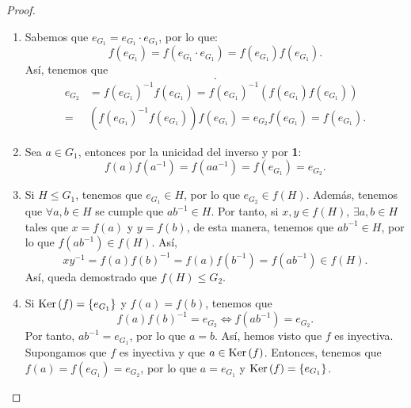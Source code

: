 \begin{proof}
\begin{enumerate}
\item Sabemos que $\displaystyle e_{G_{1}} = e_{G_{1}} \cdot e_{G_{1}} $, por lo que:
	\[f\left(e_{G_{1}}\right) = f\left(e_{G_{1}} \cdot e_{G_{1}}\right)=f\left(e_{G_{1}}\right)f\left(e_{G_{1}}\right) .\]
Así, tenemos que 
\[ .\]
\[
\begin{split}
	e_{G_{2}}  &= f\left(e_{G_{1}}\right)^{-1}f\left(e_{G_{1}}\right) = f\left(e_{G_{1}}\right)^{-1}\left(f\left(e_{G_{1}}\right)f\left(e_{G_{1}}\right)\right) \\
	= &  \left(f\left(e_{G_{1}}\right)^{-1}f\left(e_{G_{1}}\right)\right)f\left(e_{G_{1}}\right) = e_{G_{2}}f\left(e_{G_{1}}\right) = f\left(e_{G_{1}}\right).
\end{split}
\]
\item Sea $\displaystyle a \in G_{1} $, entonces por la unicidad del inverso y por \textbf{1}:
	\[f\left(a\right) f\left(a^{-1}\right) = f\left(a a^{-1}\right) = f\left(e_{G_{1}}\right) = e_{G_{2}} .\]
\item Si $\displaystyle H \leq G_{1} $, tenemos que $\displaystyle e_{G_{1}} \in H $, por lo que $\displaystyle e_{G_{2}} \in f\left(H\right) $. Además, tenemos que $\displaystyle \forall a,b \in H $ se cumple que $\displaystyle a b^{-1} \in H $. Por tanto, si $\displaystyle x,y \in f\left(H\right) $, $\displaystyle \exists a,b \in H $ tales que $\displaystyle x = f\left(a\right) $ y $\displaystyle y = f\left(b\right) $, 
	de esta manera, tenemos que $\displaystyle ab^{-1} \in H $, por lo que $\displaystyle f\left(ab^{-1}\right) \in f\left(H\right) $. Así, 
	\[xy^{-1} = f\left(a\right)f\left(b\right)^{-1} = f\left(a\right)f\left(b^{-1}\right) = f\left(ab^{-1}\right) \in f\left(H\right) .\]
	Así, queda demostrado que $\displaystyle f\left(H\right) \leq G_{2} $.
\item Si $\displaystyle \operatorname{Ker}\left(f\right) = \left\{ e_{G_{1}}\right\}  $ y $\displaystyle f\left(a\right) = f\left(b\right) $, tenemos que 
	\[f\left(a\right)f\left(b\right)^{-1} = e_{G_{2}} \iff f\left(ab^{-1}\right) = e_{G_{2}} .\]
	Por tanto, $\displaystyle ab^{-1} = e_{G_{1}} $, por lo que $\displaystyle a = b $. Así, hemos visto que $\displaystyle f $ es inyectiva. Supongamos que $\displaystyle f $ es inyectiva y que $\displaystyle a \in \operatorname{Ker}\left(f\right) $. Entonces, tenemos que $\displaystyle f\left(a\right)=f\left(e_{G_{1}}\right) = e_{G_{2}} $, por lo que $\displaystyle a = e_{G_{1}} $ y $\displaystyle \operatorname{Ker}\left(f\right) = \left\{ e_{G_{1}}\right\}  $.

\end{enumerate}
\end{proof}
